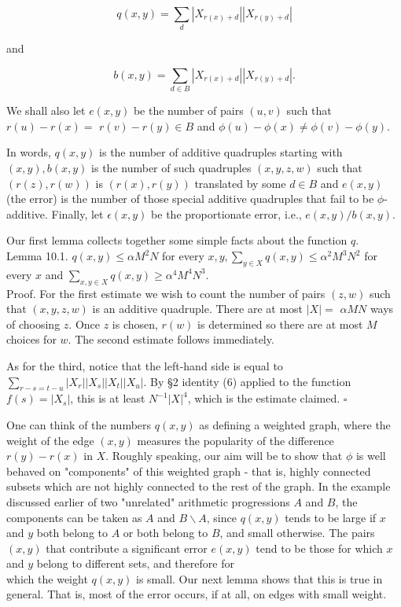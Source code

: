 \documentclass[10pt]{article}
\begin{document}
$$
q(x, y)=\sum_{d}\left|X_{r(x)+d}\right|\left|X_{r(y)+d}\right|
$$

and

$$
b(x, y)=\sum_{d \in B}\left|X_{r(x)+d}\right|\left|X_{r(y)+d}\right| .
$$

We shall also let $e(x, y)$ be the number of pairs $(u, v)$ such that $r(u)-r(x)=$ $r(v)-r(y) \in B$ and $\phi(u)-\phi(x) \neq \phi(v)-\phi(y)$.

In words, $q(x, y)$ is the number of additive quadruples starting with $(x, y), b(x, y)$ is the number of such quadruples $(x, y, z, w)$ such that $(r(z), r(w))$ is $(r(x), r(y))$ translated by some $d \in B$ and $e(x, y)$ (the error) is the number of those special additive quadruples that fail to be $\phi$-additive. Finally, let $\epsilon(x, y)$ be the proportionate error, i.e., $e(x, y) / b(x, y)$.

Our first lemma collects together some simple facts about the function $q$.\\
Lemma 10.1. $q(x, y) \leqslant \alpha M^{2} N$ for every $x, y, \sum_{y \in X} q(x, y) \leqslant \alpha^{2} M^{3} N^{2}$ for every $x$ and $\sum_{x, y \in X} q(x, y) \geqslant \alpha^{4} M^{4} N^{3}$.\\
Proof. For the first estimate we wish to count the number of pairs $(z, w)$ such that $(x, y, z, w)$ is an additive quadruple. There are at most $|X|=$ $\alpha M N$ ways of choosing $z$. Once $z$ is chosen, $r(w)$ is determined so there are at most $M$ choices for $w$. The second estimate follows immediately.

As for the third, notice that the left-hand side is equal to $\sum_{r-s=t-u}\left|X_{r}\right|\left|X_{s}\right|\left|X_{t}\right|\left|X_{u}\right|$. By §2 identity (6) applied to the function $f(s)=\left|X_{s}\right|$, this is at least $N^{-1}|X|^{4}$, which is the estimate claimed. \(\square\)

One can think of the numbers $q(x, y)$ as defining a weighted graph, where the weight of the edge $(x, y)$ measures the popularity of the difference $r(y)-r(x)$ in $X$. Roughly speaking, our aim will be to show that $\phi$ is well behaved on "components" of this weighted graph - that is, highly connected subsets which are not highly connected to the rest of the graph. In the example discussed earlier of two "unrelated" arithmetic progressions $A$ and $B$, the components can be taken as $A$ and $B \backslash A$, since $q(x, y)$ tends to be large if $x$ and $y$ both belong to $A$ or both belong to $B$, and small otherwise. The pairs $(x, y)$ that contribute a significant error $e(x, y)$ tend to be those for which $x$ and $y$ belong to different sets, and therefore for\\
which the weight $q(x, y)$ is small. Our next lemma shows that this is true in general. That is, most of the error occurs, if at all, on edges with small weight.
\end{document}
